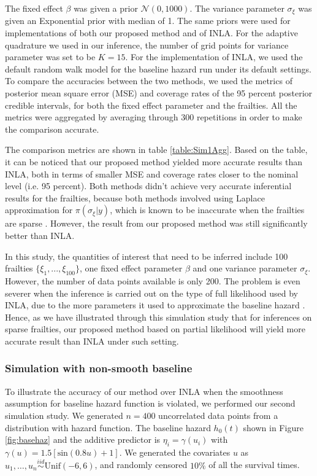 \documentclass[ba]{imsart}
\begin{document}
The fixed effect $\beta$ was given a prior $\mathcal{N}(0,1000)$. The variance parameter $\sigma_\xi$ was given an Exponential prior with median of 1. The same priors were used for implementations of both our proposed method and of INLA. For the adaptive quadrature we used in our inference, the number of grid points for variance parameter was set to be $K = 15$. For the implementation of INLA, we used the default random walk model for the baseline hazard run under its default settings. To compare the accuracies between the two methods, we used the metrics of posterior mean square error (MSE) and coverage rates of the 95 percent posterior credible intervals, for both the fixed effect parameter and the frailties. All the metrics were aggregated by averaging through 300 repetitions in order to make the comparison accurate. 

The comparison metrics are shown in table \ref{table:Sim1Agg}. Based on the table, it can be noticed that our proposed method yielded more accurate results than INLA, both in terms of smaller MSE and coverage rates closer to the nominal level (i.e. 95 percent). Both methods didn't achieve very accurate inferential results for the frailties, because both methods involved using Laplace approximation for $\pi(\sigma_\xi|y)$, which is known to be inaccurate when the frailties are sparse \citep{Ogden2013ASR}. However, the result from our proposed method was still significantly better than INLA.

In this study, the quantities of interest that need to be inferred include 100 frailties $\{\xi_1,...,\xi_{100}\}$, one fixed effect parameter $\beta$ and one variance parameter $\sigma_\xi$. However, the number of data points available is only 200. The problem is even severer when the inference is carried out on the type of full likelihood used by INLA, due to the more parameters it used to approximate the baseline hazard \citep{coxdiscussion}. Hence, as we have illustrated through this simulation study that for inferences on sparse frailties, our proposed method based on partial likelihood will yield more accurate result than INLA under such setting.

\subsubsection{Simulation with non-smooth baseline}\label{subsubsec:sim2}

To illustrate the accuracy of our method over INLA when the smoothness assumption for baseline hazard function is violated, we performed our second simulation study. We generated $n = 400$ uncorrelated data points from a distribution with hazard function. The baseline hazard $h_{0}(t)$ shown in Figure \ref{fig:basehaz} and the additive predictor is $\eta_{i} = \gamma\left(u_{i}\right)$ with $\gamma(u) = 1.5 [ \text{sin}(0.8u) + 1 ]$. We generated the covariates $u$ as  $u_{1},\ldots,u_{n}\overset{iid}{\sim}\text{Unif}(-6,6)$, and randomly censored $10\%$ of all the survival times.
\end{document}
